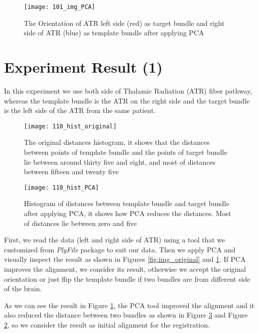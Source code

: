 \documentclass[../structure.tex]{subfiles}
\begin{document}
\begin{figure}[H]
\centering
\texttt{[image: 101\_img\_PCA]}
\captionsetup{justification=centering}
\caption{The Orientation of ATR left side (red) as target bundle and right side of ATR (blue) as template bundle after applying PCA}
\label{fig:img_PCA}
\end{figure}

\section{Experiment Result (1)}
\hspace{2em}In this experiment we use both side of Thalamic Radiation (ATR) fiber pathway, whereas the template bundle is the ATR on the right side and the target bundle is the left side of the ATR from the same patient.

\begin{figure}[H]
\centering
\texttt{[image: 110\_hist\_original]}
\captionsetup{justification=centering}
\caption{The original distances histogram, it shows that the distances between points of template bundle and the points of target bundle lie between around thirty five and eight, and most of distances between fifteen and twenty five}
\label{fig:hist_original}
\end{figure}

\begin{figure}[H]
\centering
\texttt{[image: 110\_hist\_PCA]}
\captionsetup{justification=centering}
\caption{Histogram of distances between template bundle and target bundle after applying PCA, it shows how PCA reduces the distances. Most of distances lie between zero and five}
\label{fig:hist_PCA}
\end{figure}


First, we read the data (left and right side of ATR) using a tool that we customized from \textit{PlyFile} package to suit our data. Then we apply PCA and visually inspect the result as shown in Figures \ref{fig:img_original} and \ref{fig:img_PCA}. If PCA improves the alignment, we consider its result, otherwise we accept the original orientation or just flip the template bundle if two bundles are from different side of the brain.

As we can see the result in Figure \ref{fig:img_PCA}, the PCA tool improved the alignment and it also reduced the distance between two bundles as shown in Figure \ref{fig:hist_PCA} and Figure \ref{fig:hist_original}, so we consider the result as initial alignment for the registration.
\end{document}
